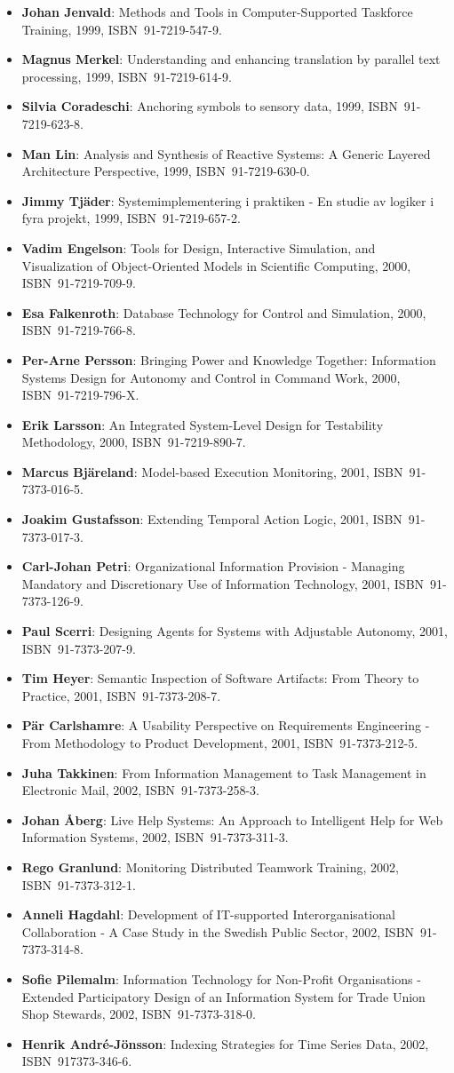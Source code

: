 \documentclass[a4paper,showtrims,twocolumn]{memoir}
\newenvironment{theses}{
  \begin{itemize}
    \setlength{\itemsep}{0.2em}
    \setlength{\parskip}{0em}
    \setlength{\parsep}{0em}
}{
  \end{itemize}
}
\newcommand{\thesis}[5]{\item[No.~#1] \textbf{#2}: #3, #4, ISBN~#5.}
\begin{document}
\begin{theses}
    \thesis{598}{Johan Jenvald}{Methods and Tools in Computer-Supported Taskforce Training}{1999}{91-7219-547-9}
    \thesis{607}{Magnus Merkel}{Understanding and enhancing translation by parallel text processing}{1999}{91-7219-614-9}
    \thesis{611}{Silvia Coradeschi}{Anchoring symbols to sensory data}{1999}{91-7219-623-8}
    \thesis{613}{Man Lin}{Analysis and Synthesis of Reactive Systems: A Generic Layered Architecture Perspective}{1999}{91-7219-630-0}
    \thesis{618}{Jimmy Tjäder}{Systemimplementering i praktiken - En studie av logiker i fyra projekt}{1999}{91-7219-657-2}
    \thesis{627}{Vadim Engelson}{Tools for Design, Interactive Simulation, and Visualization of Object-Oriented Models in Scientific Computing}{2000}{91-7219-709-9}
    \thesis{637}{Esa Falkenroth}{Database Technology for Control and Simulation}{2000}{91-7219-766-8}
    \thesis{639}{Per-Arne Persson}{Bringing Power and Knowledge Together: Information Systems Design for Autonomy and Control in Command Work}{2000}{91-7219-796-X}
    \thesis{660}{Erik Larsson}{An Integrated System-Level Design for Testability Methodology}{2000}{91-7219-890-7}
    \thesis{688}{Marcus Bjäreland}{Model-based Execution Monitoring}{2001}{91-7373-016-5}
    \thesis{689}{Joakim Gustafsson}{Extending Temporal Action Logic}{2001}{91-7373-017-3}
    \thesis{720}{Carl-Johan Petri}{Organizational Information Provision - Managing Mandatory and Discretionary Use of Information Technology}{2001}{91-7373-126-9}
    \thesis{724}{Paul Scerri}{Designing Agents for Systems with Adjustable Autonomy}{2001}{91-7373-207-9}
    \thesis{725}{Tim Heyer}{Semantic Inspection of Software Artifacts: From Theory to Practice}{2001}{91-7373-208-7}
    \thesis{726}{Pär Carlshamre}{A Usability Perspective on Requirements Engineering - From Methodology to Product Development}{2001}{91-7373-212-5}
    \thesis{732}{Juha Takkinen}{From Information Management to Task Management in Electronic Mail}{2002}{91-7373-258-3}
    \thesis{745}{Johan Åberg}{Live Help Systems: An Approach to Intelligent Help for Web Information Systems}{2002}{91-7373-311-3}
    \thesis{746}{Rego Granlund}{Monitoring Distributed Teamwork Training}{2002}{91-7373-312-1}
    \thesis{747}{Anneli Hagdahl}{Development of IT-supported Interorganisational Collaboration - A Case Study in the Swedish Public Sector}{2002}{91-7373-314-8}
    \thesis{749}{Sofie Pilemalm}{Information Technology for Non-Profit Organisations - Extended Participatory Design of an Information System for Trade Union Shop Stewards}{2002}{91-7373-318-0}
    \thesis{757}{Henrik André-Jönsson}{Indexing Strategies for Time Series Data}{2002}{917373-346-6}

\end{theses}
\end{document}
